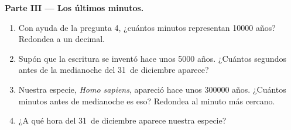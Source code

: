 \begin{problem}
\medskip
\noindent\textbf{Parte III --- Los últimos minutos.}\par\nopagebreak
\begin{enumerate}[resume, beginpenalty=10000]
  \item Con ayuda de la pregunta 4, ¿cuántos minutos representan
        \num{10000} años? Redondea a un decimal.
  \item Supón que la escritura se inventó hace unos \num{5000} años.
        ¿Cuántos segundos antes de la medianoche del 31~de diciembre
        aparece?
  \item Nuestra especie, \emph{Homo sapiens}, apareció hace unos
        \num{300000} años. ¿Cuántos minutos antes de medianoche es eso?
        Redondea al minuto más cercano.
  \item ¿A qué hora del 31~de diciembre aparece nuestra especie?
\end{enumerate}
\end{problem}
